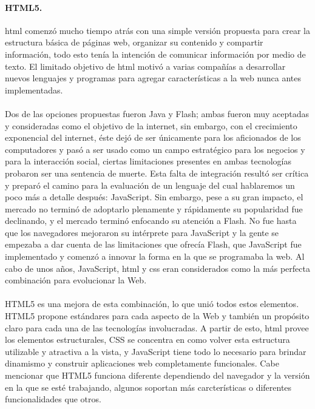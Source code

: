 \documentclass[12pt, a4paper, titlepage]{report}
\begin{document}
				\paragraph{HTML5. \\}
				\acrlong{html} comenzó mucho tiempo atrás con una simple versión propuesta para crear la estructura básica de páginas web, organizar su contenido y compartir información, todo esto tenía la intención de comunicar información por medio de texto. El limitado objetivo de \acrshort{html} motivó a varias compañías a desarrollar nuevos lenguajes y programas para agregar características a la web nunca antes implementadas.   \\\\
				Dos de las opciones propuestas fueron Java y \Gls{Flash}; ambas fueron muy aceptadas y consideradas como el objetivo de la internet, sin embargo, con el crecimiento exponencial del internet, éste dejó de ser únicamente para los aficionados de los computadores y pasó a ser usado como un campo estratégico para los negocios y para la interacción social, ciertas limitaciones presentes en ambas tecnologías probaron ser una sentencia de muerte. Esta falta de integración resultó ser crítica y preparó el camino para la evaluación de un lenguaje del cual hablaremos un poco más a detalle después: JavaScript. Sin embargo, pese a su gran impacto, el mercado no terminó de adoptarlo plenamente y rápidamente su popularidad fue declinando, y el mercado terminó enfocando su atención a Flash. No fue hasta que los navegadores mejoraron su intérprete para JavaScript y la gente se empezaba a dar cuenta de las limitaciones que ofrecía Flash, que JavaScript fue implementado y comenzó a innovar la forma en la que se programaba la web. Al cabo de unos años, JavaScript, \acrshort{html} y \acrshort{css} eran considerados como la más perfecta combinación para evolucionar la Web. \\\\
				HTML5 es una mejora de esta combinación, lo que unió todos estos elementos. HTML5 propone estándares para cada aspecto de la Web y también un propósito claro para cada una de las tecnologías involucradas. A partir de esto, \acrshort{html} provee los elementos estructurales, CSS se concentra en como volver esta estructura utilizable y atractiva a la vista, y JavaScript tiene todo lo necesario para brindar dinamismo y construir aplicaciones web completamente funcionales. Cabe mencionar que HTML5 funciona diferente dependiendo del navegador y la versión en la que se esté trabajando, algunos soportan más carcterísticas o diferentes funcionalidades que otros.
				
\end{document}
